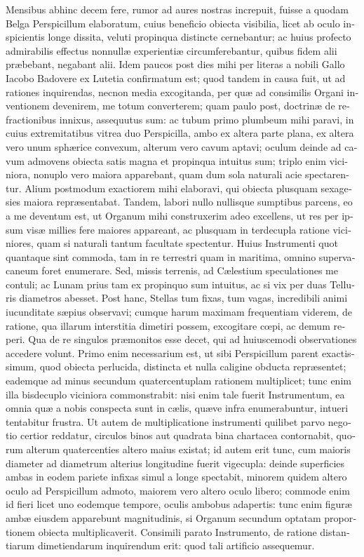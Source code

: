 \documentclass[11pt,twoside,openany]{book}
\begin{document}
\begin{otherlanguage}{latin}
Mensibus abhinc decem fere, rumor ad aures nostras increpuit, fuisse a quodam Belga Perspicillum elaboratum, cuius beneficio obiecta visibilia, licet ab oculo inspicientis longe dissita, veluti propinqua distincte cernebantur; ac huius profecto admirabilis effectus nonnullæ experientiæ circumferebantur, quibus fidem alii præbebant, negabant alii. Idem paucos post dies mihi per literas a nobili Gallo Iacobo Badovere\textsc{ }ex Lutetia confirmatum est; quod tandem in causa fuit, ut ad rationes inquirendas, necnon media excogitanda, per quæ ad consimilis Organi inventionem devenirem, me totum converterem; quam paulo post, doctrinæ de refractionibus innixus, assequutus sum: ac tubum primo plumbeum mihi paravi, in cuius extremitatibus vitrea duo Perspicilla, ambo ex altera parte plana, ex altera vero unum sphærice convexum, alterum vero cavum aptavi; oculum deinde ad cavum admovens obiecta satis magna et propinqua intuitus sum; triplo enim viciniora, nonuplo vero maiora apparebant, quam dum sola naturali acie spectarentur. Alium postmodum exactiorem mihi elaboravi, qui obiecta plusquam sexagesies maiora repræsentabat. Tandem, labori nullo nullisque sumptibus parcens, eo a me deventum est, ut Organum mihi construxerim adeo excellens, ut res per ipsum visæ millies fere maiores appareant, ac plusquam in terdecupla ratione viciniores, quam si naturali tantum facultate spectentur. Huius Instrumenti quot quantaque sint commoda, tam in re terrestri quam in maritima, omnino supervacaneum foret enumerare. Sed, missis terrenis, ad Cælestium speculationes me contuli; ac Lunam prius tam ex propinquo sum intuitus, ac si vix per duas Telluris diametros\textsc{ }abesset. Post hanc, Stellas tum fixas, tum vagas,\textsc{ }incredibili animi iucunditate sæpius observavi; cumque harum maximam frequentiam viderem, de ratione, qua illarum interstitia dimetiri possem, excogitare cœpi, ac demum reperi. Qua de re singulos præmonitos esse decet, qui ad huiuscemodi observationes accedere volunt. Primo enim necessarium est, ut sibi Perspicillum parent exactissimum, quod obiecta perlucida, distincta et nulla caligine obducta repræsentet; eademque ad minus secundum quatercentuplam rationem multiplicet; tunc enim illa bisdecuplo viciniora commonstrabit: nisi enim tale fuerit Instrumentum, ea omnia quæ a nobis conspecta sunt in cælis, quæve infra enumerabuntur, intueri tentabitur frustra. Ut autem de multiplicatione instrumenti quilibet parvo negotio certior reddatur, circulos binos aut quadrata bina chartacea contornabit, quorum alterum quatercenties altero maius existat; id autem erit tunc, cum maioris diameter ad diametrum alterius longitudine fuerit vigecupla: deinde superficies ambas in eodem pariete infixas simul a longe spectabit, minorem quidem altero oculo ad Perspicillum admoto, maiorem vero altero oculo libero; commode enim id fieri licet uno eodemque tempore, oculis ambobus adapertis: tunc enim figuræ ambæ eiusdem apparebunt magnitudinis, si Organum secundum optatam proportionem obiecta multiplicaverit. Consimili parato Instrumento, de ratione distantiarum dimetiendarum inquirendum erit: quod tali artificio assequemur.


\end{otherlanguage}
\end{document}
